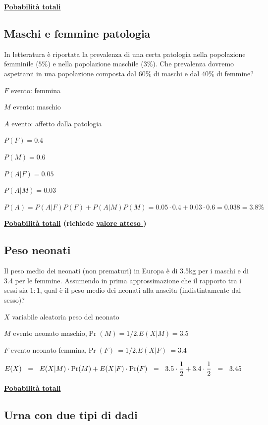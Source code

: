 \documentclass[11pt,openany]{book}
\begin{document}
\hfill\textbf{{\color{brown}\hyperref[TeoremaProbabilitaTotali]{Pobabilità totali} \faShare}}
\subsection{Maschi e femmine patologia}
\label{MF_totali}



In letteratura è riportata la prevalenza di una certa patologia nella popolazione femminile ($5\%$) e nella popolazione maschile ($3\%$). Che prevalenza dovremo aspettarci in una popolazione composta dal $60\%$ di maschi e dal $40\%$ di femmine?

$F$ evento: femmina

$M$ evento: maschio

$A$ evento: affetto dalla patologia

$P(F)=0.4$

$P(M)=0.6$

$P(A|F)=0.05$

$P(A|M)=0.03$

$P(A)=P(A|F)P(F)+P(A|M)P(M)=0.05\cdot0.4+0.03\cdot0.6=0.038=3.8\%$


\hfill{}\clearpage
\hfill\textbf{{\color{brown}\hyperref[TeoremaProbabilitaTotaliMedia]{Pobabilità totali} \faShare} (richiede \hyperref[ValoreAtteso]{valore atteso \faShare})}
\subsection{Peso neonati}
\label{Neonati_totali}

Il peso medio dei neonati (non prematuri) in Europa è di 3.5kg per i maschi e di 3.4 per le femmine. Assumendo in prima approssimazione che il rapporto tra i sessi sia $1:1$, qual è il peso medio dei neonati alla nascita (indistintamente dal sesso)?

$X$ variabile aleatoria peso del neonato

$M$ evento neonato maschio,\quad $\Pr(M)=1/2$,\quad $E(X|M)=3.5$

$F$ evento neonato femmina,\quad $\Pr(F)\ =1/2$,\quad $E(X|F)\ =3.4$


$E(X)\medrel{=}E(X|M)\cdot\Pr(M)+ E(X|F)\cdot\Pr(F)\medrel{=}3.5\cdot\dfrac12 + 3.4\cdot\dfrac12\medrel{=}3.45$


\hfill{}\clearpage
\hfill\textbf{{\color{brown}\hyperref[TeoremaProbabilitaTotali]{Pobabilità totali} \faShare}}
\subsection{Urna con due tipi di dadi}
\label{dadi_diversi}
\end{document}

